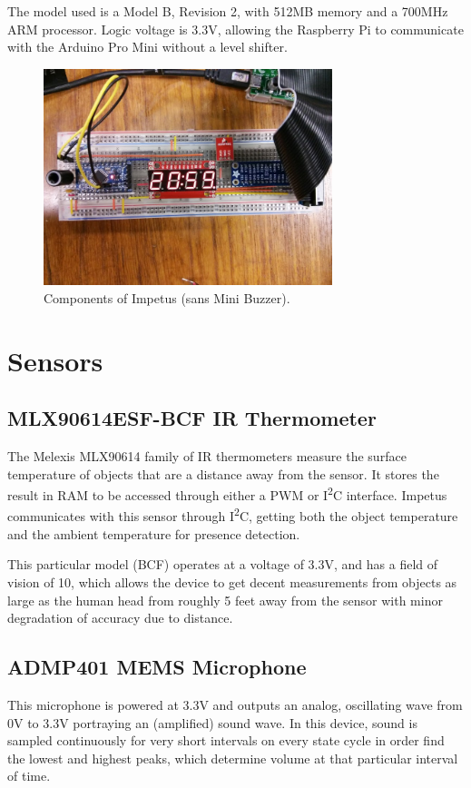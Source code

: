 The model used is a Model B, Revision 2, with 512MB memory and a 700MHz
ARM processor. Logic voltage is 3.3V, allowing the Raspberry Pi to
communicate with the Arduino Pro Mini without a level shifter.

\begin{figure}[h!]
  \centering \includegraphics[width=0.75\textwidth]{bb}
  \caption{Components of Impetus (sans Mini Buzzer).}
\end{figure}

\section{Sensors}
\subsection{MLX90614ESF-BCF IR Thermometer}
The Melexis MLX90614 family of IR thermometers measure the surface
temperature of objects that are a distance away from the sensor. It
stores the result in RAM to be accessed through either a PWM or
I\textsuperscript{2}C interface. Impetus communicates with this sensor
through I\textsuperscript{2}C, getting both the object temperature and
the ambient temperature for presence detection.

This particular model (BCF) operates at a voltage of 3.3V, and has a
field of vision of 10\degree, which allows the device to get decent
measurements from objects as large as the human head from roughly 5
feet away from the sensor with minor degradation of accuracy due to
distance.

\subsection{ADMP401 MEMS Microphone}
This microphone is powered at 3.3V and outputs an analog, oscillating
wave from 0V to 3.3V portraying an (amplified) sound wave. In this
device, sound is sampled continuously for very short intervals on
every state cycle in order find the lowest and highest peaks, which
determine volume at that particular interval of time.

